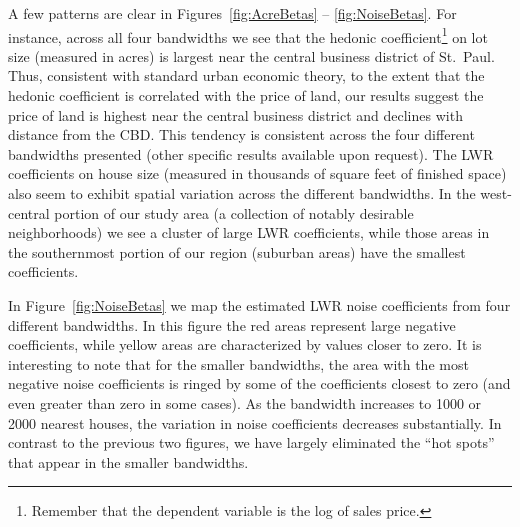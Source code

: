\documentclass{article}\usepackage{graphicx, color}
\begin{document}
A few patterns are clear in Figures~\ref{fig:AcreBetas} -- \ref{fig:NoiseBetas}. For instance, across all four bandwidths we see that the hedonic coefficient\footnote{Remember that the dependent variable is the log of sales price.} on lot size (measured in acres) is largest near the central business district of St.\ Paul. Thus, consistent with standard urban economic theory, to the extent that the hedonic coefficient is correlated with the price of land, our results suggest the price of land is highest near the central business district and declines with distance from the CBD. This tendency is consistent across the four different bandwidths presented (other specific results available upon request). The LWR coefficients on house size (measured in thousands of square feet of finished space) also seem to exhibit spatial variation across the different bandwidths. In the west-central portion of our study area (a collection of notably desirable neighborhoods) we see a cluster of large LWR coefficients, while those areas in the southernmost portion of our region (suburban areas) have the smallest coefficients. 

In Figure~\ref{fig:NoiseBetas} we map the estimated LWR noise coefficients from four different bandwidths. In this figure the red areas represent large negative coefficients, while yellow areas are characterized by values closer to zero. It is interesting to note that for the smaller bandwidths, the area with the most negative noise coefficients is ringed by some of the coefficients closest to zero (and even greater than zero in some cases). As the bandwidth increases to 1000 or 2000 nearest houses, the variation in noise coefficients decreases substantially. In contrast to the previous two figures, we have largely eliminated the ``hot spots'' that appear in the smaller bandwidths. 
\end{document}
